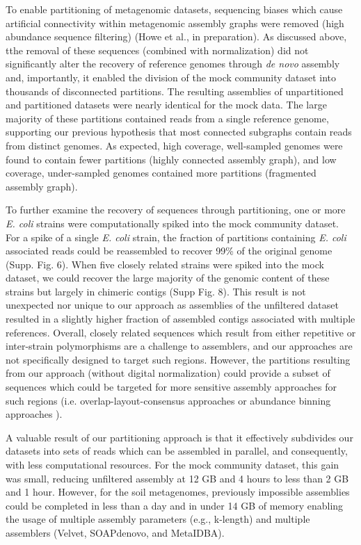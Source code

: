 \documentclass[11pt]{article} %
\begin{document}
To enable partitioning of metagenomic datasets, sequencing biases
which cause artificial connectivity within metagenomic assembly graphs
were removed (high abundance sequence filtering) (Howe et al., in preparation).  
As discussed
above, tthe removal of these sequences (combined with normalization)
did not significantly alter the recovery of reference genomes through
{\em de novo} assembly and, importantly, it enabled the division of the mock
community dataset into thousands of disconnected partitions.  The
resulting assemblies of unpartitioned and partitioned datasets were
nearly identical for the mock data.  The large majority of these partitions contained
reads from a single reference genome, supporting our previous
hypothesis that most connected subgraphs contain reads from distinct genomes.  As
expected, high coverage, well-sampled genomes were found to contain
fewer partitions (highly connected assembly graph), and low coverage,
under-sampled genomes contained more partitions (fragmented assembly
graph).

To further examine the recovery of sequences through partitioning, one
or more \emph{E. coli} strains were computationally spiked into the
mock community dataset.  For a spike of a single \emph{E. coli}
strain, the fraction of partitions containing \emph{E. coli}
associated reads could be reassembled to recover 99\% of the original
genome (Supp. Fig. 6).  When five closely related strains were
spiked into the mock dataset, we could recover the large majority of
the genomic content of these strains but largely in chimeric contigs
(Supp Fig. 8).  This result is not unexpected
nor unique to our approach as assemblies of the unfiltered dataset
resulted in a slightly higher fraction of assembled contigs associated
with multiple references.  Overall, closely related sequences which
result from either repetitive or inter-strain polymorphisms are a
challenge to assemblers, and our approaches are not specifically
designed to target such regions.  However, the partitions resulting
from our approach (without digital normalization) could provide a
subset of sequences which could be targeted for more sensitive
assembly approaches for such regions (i.e. overlap-layout-consensus
approaches or abundance binning approaches \cite{Sharon:2012kx}).

A valuable result of our partitioning approach is that it effectively
subdivides our datasets into sets of reads which can be assembled in
parallel, and consequently, with less computational resources.  For
the mock community dataset, this gain was small, reducing unfiltered
assembly at 12 GB and 4 hours to less than 2 GB and 1 hour.  However,
for the soil metagenomes, previously impossible assemblies could be
completed in less than a day and in under 14 GB of memory enabling the
usage of multiple assembly parameters (e.g., k-length) and multiple
assemblers (Velvet, SOAPdenovo, and MetaIDBA).
\end{document}
